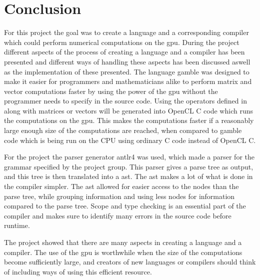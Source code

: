 \chapter{Conclusion} %
\label{cha:conclusion}
For this project the goal was to create a language and a corresponding compiler which could perform numerical computations on the \acrshort{gpu}.
During the project different aspects of the process of creating a language and a compiler has been presented and different ways of handling these aspects has been discussed aswell as the implementation of these presented.
The language \gls{gamble} was designed to make it easier for programmers and mathematicians alike to perform matrix and vector computations faster by using the power of the \acrshort{gpu} without the programmer needs to specify in the source code.
Using the operators defined in  along with matrices or vectors will be generated into OpenCL C code which runs the computations on the \acrshort{gpu}.
This makes the computations faster if a reasonably large enough size of the computations are reached, when compared to \gls{gamble} code which is being run on the CPU using ordinary C code instead of OpenCL C.

For the project the parser generator \acrshort{antlr}4 was used, which made a parser for the grammar specified by the project group.
This parser gives a parse tree as output, and this tree is then translated into a \acrshort{ast}.
The \acrshort{ast} makes a lot of what is done in the compiler simpler.
The \acrshort{ast} allowed for easier access to the nodes than the parse tree, while grouping information and using less nodes for information compared to the parse tree.
Scope and type checking is an essential part of the compiler and makes sure to identify many errors in the source code before runtime.

The project showed that there are many aspects in creating a language and a compiler.
The use of the \acrshort{gpu} is worthwhile when the size of the computations become sufficiently large, and creators of new languages or compilers should think of including ways of using this efficient resource.